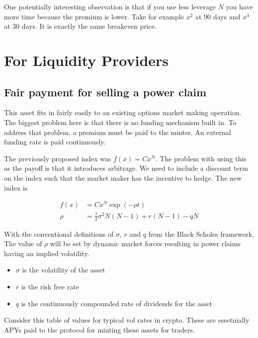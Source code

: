 \documentclass[12pt]{article}
\newcommand{\half}{\tfrac{1}{2}}
\begin{document}
    One potentially interesting observation is that if you use less leverage $N$ you have more time because the premium is lower. Take for example $x^2$ at 90 days and $x^4$ at 30 days. It is exactly the same breakeven price.

    \section{For Liquidity Providers}

    \subsection{Fair payment for selling a power claim}

    This asset fits in fairly easily to an existing options market making operation. The biggest problem here is that there is no funding mechanism built in. To address that problem, a premium must be paid to the minter. An external funding rate is paid continuously.

    The previously proposed index was $f(x) = C x^N$. The problem with using this as the payoff is that it introduces arbitrage. We need to include a discount term on the index such that the market maker has the incentive to hedge. The new index is

    \begin{align*}
        f(x) &= C x^N \exp(-\rho t)\\
        \rho &= \half \sigma^2 N (N-1) + r (N-1) - q N
    \end{align*}

    With the conventional definitions of $\sigma$, $r$ and $q$ from the Black Scholes framework. The value of $\rho$ will be set by dynamic market forces resulting in power claims having an implied volatility.

    \begin{itemize}
        \item $\sigma$ is the volatility of the asset
        \item $r$ is the risk free rate
        \item $q$ is the continuously compounded rate of dividends for the asset
    \end{itemize}

    Consider this table of values for typical vol rates in crypto. These are essetnially APYs paid to the protocol for minting these assets for traders.
\end{document}
